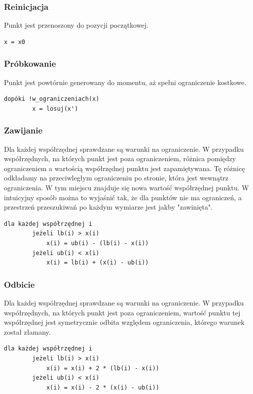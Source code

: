 \documentclass{mini}
\begin{document}
\subsubsection{Reinicjacja} \label{reinicjacja}
Punkt jest przenoszony do pozycji początkowej.

\begin{Verbatim}[baselinestretch=1.1]
	x = x0
\end{Verbatim}

\subsubsection{Próbkowanie}
Punkt jest powtórnie generowany do momentu, aż spełni ograniczenie kostkowe.

\begin{Verbatim}[baselinestretch=1.1]
	dopóki !w_ograniczeniach(x)
		x = losuj(x')
\end{Verbatim}

\subsubsection{Zawijanie}
Dla każdej współrzędnej sprawdzane są warunki na ograniczenie. W przypadku współrzędnych, na których punkt jest poza ograniczeniem, różnica pomiędzy ograniczeniem a wartością współrzędnej punktu jest zapamiętywana. Tę różnicę odkładamy na przeciwległym ograniczeniu po stronie, która jest wewnątrz ograniczenia. W tym miejscu znajduje się nowa wartość współrzędnej punktu. W intuicyjny sposób można to wyjaśnić tak, że dla punktów nie ma ograniczeń, a przestrzeń przeszukiwań po każdym wymiarze jest jakby "zawinięta".

\begin{Verbatim}[baselinestretch=1.1]
	dla każdej współrzędnej i
		jeżeli lb(i) > x(i)
			x(i) = ub(i) - (lb(i) - x(i))
		jeżeli ub(i) < x(i)
			x(i) = lb(i) + (x(i) - ub(i))
\end{Verbatim}

\subsubsection{Odbicie}
Dla każdej współrzędnej sprawdzane są warunki na ograniczenie. W przypadku współrzędnych, na których punkt jest poza ograniczeniem, wartość punktu tej współrzędnej jest symetrycznie odbita względem ograniczenia, którego warunek został złamany.

\begin{Verbatim}[baselinestretch=1.1]
	dla każdej współrzędnej i
		jeżeli lb(i) > x(i)
			x(i) = x(i) + 2 * (lb(i) - x(i))
		jeżeli ub(i) < x(i)
			x(i) = x(i) - 2 * (x(i) - ub(i))
\end{Verbatim}
\end{document}
